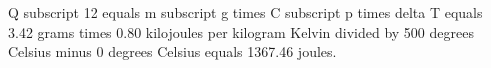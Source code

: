 Q subscript 12 equals m subscript g times C subscript p times delta T equals 3.42 grams times 0.80 kilojoules per kilogram Kelvin divided by 500 degrees Celsius minus 0 degrees Celsius equals 1367.46 joules.